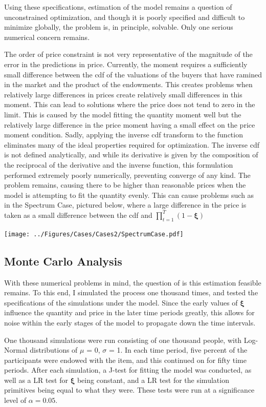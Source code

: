 \documentclass[12pt, letterpaper]{paper}
\begin{document}
Using these specifications, estimation of the model remains a question of
unconstrained optimization, and though it is poorly specified and
difficult to minimize globally, the problem is, in principle,
solvable. Only one serious numerical concern remains.

The order of price constraint is not very representative of the
magnitude of the error in the predictions in price. Currently, the
moment requires a sufficiently small difference between the cdf of the
valuations of the buyers that have ramined in the market and the
product of the endowments. This creates problems when relatively large
differences in prices create relatively small differences in this
moment. This can lead to solutions where the price does not tend to
zero in the limit. This is caused by the model fitting the quantity
moment well but the relatively large difference in the price moment
having a small effect on the price moment condition. Sadly, applying
the inverse cdf transform to the function eliminates many of the ideal
properties required for optimization. The inverse cdf is not defined
analytically, and while its derivative is given by the composition of
the reciprocal of the derivative and the inverse function, this
formulation performed extremely poorly numerically, preventing
converge of any kind. The problem remains, causing there to be higher
than reasonable prices when the model is attempting to fit the
quantity evenly. This can cause problems such as in the Spectrum Case,
pictured below, where a large difference in the price is taken as a
small difference between the cdf and $\prod_{t=1}^T ( 1 - \bm{\xi} )$

\texttt{[image: ../Figures/Cases/Cases2/SpectrumCase.pdf]}

\subsection{Monte Carlo Analysis}
\label{sec-4-3}
With these numerical problems in mind, the question of is this
estimation feasible remains. To this end, I simulated the process one
thousand times, and tested the specifications of the simulations under
the model. Since the early values of $\bm{\xi}$ influence the quantity and
price in the later time periods greatly, this allows for noise within
the early stages of the model to propagate down the time intervals.

One thousand simulations were run consisting of one thousand people,
with Log-Normal distributions of $\mu$ = 0, $\sigma$ = 1. In each time period, five
percent of the participants were endowed with the item, and this
continued on for fifty time periods. After each simulation, a J-test
for fitting the model was conducted, as well as a LR test for $\bm{\xi}$ being
constant, and a LR test for the simulation primitives being equal to
what they were. These tests were run at a significance level of $\alpha = 0.05$.
\end{document}
